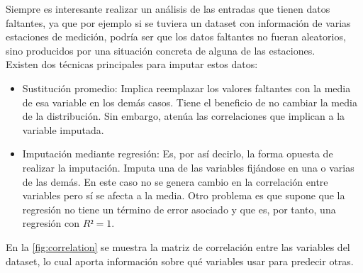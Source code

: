 Siempre es interesante realizar un análisis de las entradas que tienen datos faltantes, ya que por ejemplo si se tuviera un dataset con información de varias estaciones de medición, podría ser que los datos faltantes no fueran aleatorios, sino producidos por una situación concreta de alguna de las estaciones.\\

Existen dos técnicas principales para imputar estos datos:

\begin{itemize}
    \item Sustitución promedio: Implica reemplazar los valores faltantes con la media de esa variable en los demás casos. Tiene el beneficio de no cambiar la media de la distribución. Sin embargo, atenúa las correlaciones que implican a la variable imputada.
    \item Imputación mediante regresión: Es, por así decirlo, la forma opuesta de realizar la imputación. Imputa una de las variables fijándose en una o varias de las demás. En este caso no se genera cambio en la correlación entre variables pero sí se afecta a la media. Otro problema es que supone que la regresión no tiene un término de error asociado y que es, por tanto, una regresión con $R² = 1$.
\end{itemize}

En la \autoref{fig:correlation} se muestra la matriz de correlación entre las variables del dataset, lo cual aporta información sobre qué variables usar para predecir otras.

